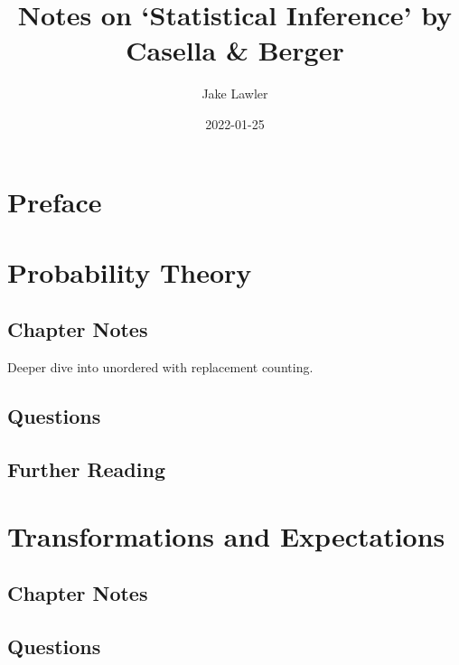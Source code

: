 \documentclass[
]{book}
\title{Notes on `Statistical Inference' by Casella \& Berger}
\author{Jake Lawler}
\date{2022-01-25}
\begin{document}
\maketitle

{
\setcounter{tocdepth}{1}
\tableofcontents
}
\hypertarget{preface}{%
\chapter*{Preface}\label{preface}}

\hypertarget{probability_theory}{%
\chapter{Probability Theory}\label{probability_theory}}

\hypertarget{chapter-notes}{%
\section{Chapter Notes}\label{chapter-notes}}

Deeper dive into unordered with replacement counting.

\hypertarget{questions}{%
\section{Questions}\label{questions}}

\hypertarget{further-reading}{%
\section*{Further Reading}\label{further-reading}}

\hypertarget{transformations}{%
\chapter{Transformations and Expectations}\label{transformations}}

\hypertarget{chapter-notes-1}{%
\section{Chapter Notes}\label{chapter-notes-1}}

\hypertarget{questions-1}{%
\section{Questions}\label{questions-1}}
\end{document}
